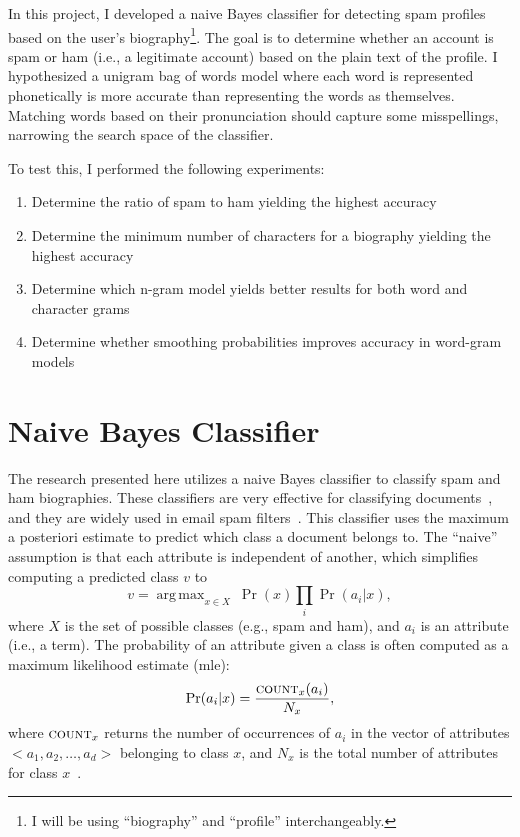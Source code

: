 \documentclass[draft,10pt]{article}
\DeclareMathOperator*{\argmax}{arg\,max}
\begin{document}
In this project, I developed a naive Bayes classifier for detecting spam
profiles based on the user's biography\footnote{I will be using ``biography''
  and ``profile'' interchangeably.}. The goal is to determine whether
an account is spam or ham (i.e., a legitimate account) based on the plain text
of the profile. I hypothesized a unigram bag of words model where each word is
represented phonetically is more accurate than representing the words as
themselves. Matching words based on their pronunciation should capture some
misspellings, narrowing the search space of the classifier.

To test this, I performed the following experiments:

\begin{enumerate}
\item Determine the ratio of spam to ham yielding the highest accuracy
\item Determine the minimum number of characters for a biography yielding
  the highest accuracy
\item Determine which n-gram model yields better results for both word and
  character grams
\item Determine whether smoothing probabilities improves accuracy in word-gram
  models
\end{enumerate}

\section{Naive Bayes Classifier}
The research presented here utilizes a naive Bayes classifier to classify spam
and ham biographies. These classifiers are very effective for classifying
documents~\cite[p182]{mitchell}, and they are widely used in email spam
filters~\cite{which-nb}. This classifier uses the maximum a posteriori
estimate to predict which class a document belongs to. The ``naive''
assumption is that each attribute is independent of another, which simplifies
computing a predicted class $v$ to
\[ v = \argmax_{x\in X}\ \Pr(x)\prod_i{\Pr(a_i|x)}, \]
where $X$ is the set of possible classes (e.g., spam and ham), and $a_i$ is an
attribute (i.e., a term). The probability of an attribute given a class is
often computed as a maximum likelihood estimate ({\sc mle}):
\[ \Pr(a_i|x) = \frac{{\textsc{count}_x}(a_i)}{N_x}, \] where
$\textsc{count}_x$ returns the number of occurrences of $a_i$ in the vector of
attributes $<a_1, a_2, \ldots, a_d>$ belonging to class $x$, and $N_x$ is the total number of attributes
for class $x$~\cite[p177]{mitchell}.
\end{document}
